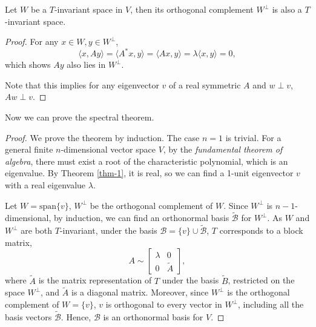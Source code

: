 \begin{theorem}
	Let $W$ be a $T$-invariant space in $V$, then its orthogonal complement $W^\perp$ is also a $T$-invariant space.
\end{theorem}

\begin{proof}

For any $x \in W, y \in W^\perp$,
\[
	\langle x, Ay\rangle = \langle A^*x, y \rangle = \langle Ax, y \rangle = \lambda \langle x,y \rangle = 0,
\]
which shows $Ay$ also lies in $W^\perp$.

Note that this implies for any eigenvector $v$ of a real symmetric $A$ and $w \perp v$, $Aw \perp v$.

\end{proof}

Now we can prove the spectral theorem.

\begin{proof}
	
	We prove the theorem by induction. The case $n=1$ is trivial. For a general finite $n$-dimensional vector space $V$, by the \emph{fundamental theorem of algebra}, there must exist a root of the characteristic polynomial, which is an eigenvalue. By Theorem \ref{thm-1}, it is real, so we can find a 1-unit eigenvector $v$ with a real eigenvalue $\lambda$.

Let $W = \text{span}\{v\}$, $W^\perp$ be the orthogonal complement of $W$. Since $W^\perp$ is $n-1$-dimensional, by induction, we can find an orthonormal basis $\mathcal{\tilde B}$ for $W^\perp$. As $W$ and $W^\perp$ are both $T$-invariant, under the basis $\mathcal{B} = \{v\} \cup \mathcal{\tilde B}$, $T$ corresponds to a block matrix,
\[	
	A \sim \begin{bmatrix} 
		\lambda & 0 \\
		0 & \tilde A
	\end{bmatrix},
\]
where $\tilde A$ is the matrix representation of $T$ under the basis $\tilde B$, restricted on the space $W^\perp$, and $\tilde A$ is a diagonal matrix. Moreover, since $W^\perp$ is the orthogonal complement of $W=\{v\}$, $v$ is orthogonal to every vector in $W^\perp$, including all the basis vectors $\mathcal{\tilde B}$. Hence, $\mathcal{B}$ is an orthonormal basis for $V$.

\end{proof}



\pagebreak

\nocite{*}
\printbibliography


